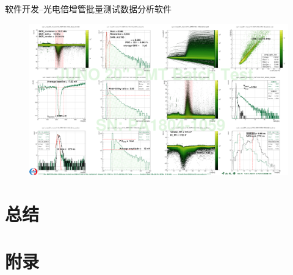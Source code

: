 \documentclass[11pt,compress,xcolor=x11names,UTF8]{beamer}
\begin{document}
\begin{frame}{软件开发--光电倍增管批量测试数据分析软件}
\vspace{-1cm}
\begin{figure}
\centering
\includegraphics[width=1.0451\textwidth]{pmtsoftware} %
\end{figure}
\end{frame}

\section{总结}

\begin{frame}

\end{frame}


%
%

\appendix

\section*{附录}



\end{document}

